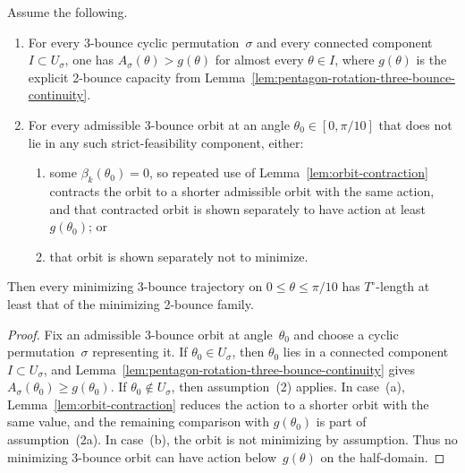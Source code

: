 \begin{unverified}
\begin{lemma}
\label{lem:pentagon-rotation-three-bounce-reduction}
Assume the following.
\begin{enumerate}
\item For every 3-bounce cyclic permutation~$\sigma$ and every connected
  component $I \subset U_\sigma$, one has
  $A_\sigma(\theta) > g(\theta)$ for almost every $\theta \in I$, where
  $g(\theta)$ is the explicit 2-bounce capacity from
  Lemma~\ref{lem:pentagon-rotation-three-bounce-continuity}.
\item For every admissible 3-bounce orbit at an angle
  $\theta_0 \in [0,\pi/10]$ that does not lie in any such strict-feasibility
  component, either:
  \begin{enumerate}
  \item some $\beta_k(\theta_0)=0$, so repeated use of
    Lemma~\ref{lem:orbit-contraction} contracts the orbit to a shorter
    admissible orbit with the same action, and that contracted orbit is shown
    separately to have action at least~$g(\theta_0)$;
    or
  \item that orbit is shown separately not to minimize.
  \end{enumerate}
\end{enumerate}
Then every minimizing 3-bounce trajectory on $0 \le \theta \le \pi/10$ has
$T^\circ$-length at least that of the minimizing 2-bounce family.
\end{lemma}

\begin{proof}
Fix an admissible 3-bounce orbit at angle~$\theta_0$ and choose a cyclic
permutation~$\sigma$ representing it.
If $\theta_0 \in U_\sigma$, then $\theta_0$ lies in a connected component
$I \subset U_\sigma$, and
Lemma~\ref{lem:pentagon-rotation-three-bounce-continuity} gives
$A_\sigma(\theta_0) \ge g(\theta_0)$.
If $\theta_0 \notin U_\sigma$, then assumption~(2) applies.
In case~(a), Lemma~\ref{lem:orbit-contraction} reduces the action to a
shorter orbit with the same value, and the remaining comparison with
$g(\theta_0)$ is part of assumption~(2a).
In case~(b), the orbit is not minimizing by assumption.
Thus no minimizing 3-bounce orbit can have action below~$g(\theta)$ on the
half-domain.
\end{proof}
\end{unverified}


